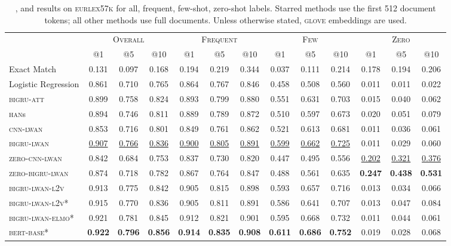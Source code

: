 \documentclass[11pt,a4paper]{article}
\newcommand{\bigruatt}{\textsc{bigru-att}\xspace}
\newcommand{\han}{\textsc{han}\xspace}
\newcommand{\lwancnn}{\textsc{cnn-lwan}\xspace}
\newcommand{\zlwancnn}{\textsc{zero-cnn-lwan}\xspace}
\newcommand{\lwangru}{\textsc{bigru-lwan}\xspace}
\newcommand{\lwangrulv}{\textsc{bigru-lwan-l2v}}
\newcommand{\lwangruelmo}{\textsc{bigru-lwan-elmo}}
\newcommand{\zlwangru}{\textsc{zero-bigru-lwan}\xspace}
\newcommand{\glove}{\textsc{glove}\xspace}
\newcommand{\bertbase}{\textsc{bert-base}\xspace}
\newcommand{\newdata}{\textsc{eurlex57k}\xspace}
\begin{document}
\vspace{-2mm}

\begin{table*}[h!]
\centering
{
\footnotesize\addtolength{\tabcolsep}{-2pt}
\begin{tabular}{lcccccccccccc}
  \hline
  & \multicolumn{3}{c}{\textsc{Overall}} & \multicolumn{3}{c}{\textsc{Frequent}} & \multicolumn{3}{c}{\textsc{Few}} & \multicolumn{3}{c}{\textsc{Zero}} \\ 
  & @1 & @5 & @10 & @1 & @5 & @10 & @1 & @5 & @10 & @1 & @5 & @10 \\
  \cline{2-13}
  Exact Match & 0.131 & 0.097 & 0.168 & 0.194 & 0.219 & 0.344 & 0.037 & 0.111 & 0.214 & 0.178 & 0.194 & 0.206 \\
  Logistic Regression & 0.861 & 0.710 & 0.765 & 0.864 & 0.767 & 0.846 & 0.458 & 0.508 & 0.560 & 0.011 & 0.011 & 0.022 \\
  \hline
  \bigruatt & 0.899 & 0.758 & 0.824 & 0.893 & 0.799 & 0.880 & 0.551 & 0.631 & 0.703 & 0.015 & 0.040 & 0.062 \\
  \han{s} & 0.894 & 0.746 & 0.811 & 0.889 & 0.789 & 0.872 & 0.510 & 0.597 & 0.673 & 0.020 & 0.051 & 0.079 \\
  \hline
 \lwancnn & 0.853 & 0.716 & 0.801 & 0.849 & 0.761 & 0.862 & 0.521 & 0.613 & 0.681 & 0.011 & 0.036 & 0.061 \\
  \lwangru & \underline{0.907} & \underline{0.766} & \underline{0.836} & \underline{0.900} & \underline{0.805} & \underline{0.891} & \underline{0.599} & \underline{0.662} & \underline{0.725} & 0.011 & 0.029 & 0.060 \\
   \hline
  \zlwancnn & 0.842 & 0.684 & 0.753 & 0.837 & 0.730 & 0.820 & 0.447 & 0.495 & 0.556 & \underline{0.202} & \underline{0.321} & \underline{0.376} \\
  \zlwangru & 0.874 & 0.718 & 0.782 & 0.867 & 0.764 & 0.847 & 0.488 & 0.561 & 0.635 & \textbf{0.247} & \textbf{0.438} & \textbf{0.531} \\
  \hline\hline
   \lwangrulv & 0.913 & 0.775 & 0.842 & 0.905 & 0.815 & 0.898 & 0.593 & 0.657 & 0.716 & 0.013 & 0.034 & 0.066 \\
\hline
\lwangrulv* & 0.915 & 0.770 & 0.836 & 0.905 & 0.811 & 0.891 & 0.586 & 0.641 & 0.707 & 0.013 & 0.047 & 0.084 \\
\lwangruelmo* & 0.921 & 0.781 & 0.845 & 0.912 & 0.821 & 0.901 & 0.595 & 0.668 & 0.732 & 0.011 & 0.044 & 0.061 \\
  \bertbase* & \textbf{0.922} & \textbf{0.796} & \textbf{0.856} & \textbf{0.914} & \textbf{0.835} & \textbf{0.908} & \textbf{0.611} & \textbf{0.686} & \textbf{0.752} & 0.019 & 0.028 & 0.068 \\
  \hline
\end{tabular}
}
\caption{,  and  results on \newdata for all, frequent, few-shot, zero-shot labels. Starred methods use the first 512 document tokens; all other methods use full documents. Unless otherwise stated, \glove embeddings are used.}
\label{tab:rpresults}
\end{table*}
\end{document}
